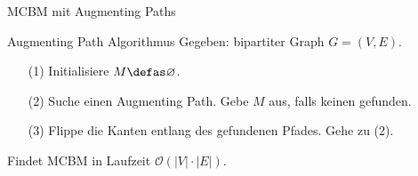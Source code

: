 \begin{frame}{MCBM mit Augmenting Paths}
\begin{block}{Augmenting Path Algorithmus}
Gegeben: bipartiter Graph \(G = (V, E)\).
\begin{itemize}
\item[(1)] Initialisiere \(M \defas \varnothing\).
\item[(2)] Suche einen Augmenting Path. Gebe \(M\) aus, falls keinen gefunden.
\item[(3)] Flippe die Kanten entlang des gefundenen Pfades. Gehe zu (2).
\end{itemize}
Findet MCBM in Laufzeit \(\mathcal{O}(|V|\cdot |E|)\).
\end{block}
\end{frame}